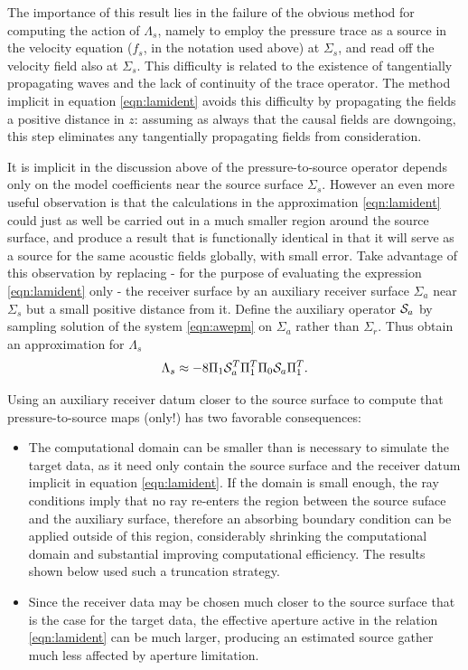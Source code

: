 \documentclass[georeport,12pt]{geophysics}
\begin{document}
The importance of this result lies in the failure of the obvious
method for computing the action of $\Lambda_s$, namely to
employ the pressure trace as a source in the velocity equation ($f_s$,
in the notation used above) at $\Sigma_s$, and read off the velocity
field also at $\Sigma_s$. This difficulty is related to the existence of
tangentially propagating waves and the lack of continuity of the trace
operator. The method implicit in equation \ref{eqn:lamident} avoids
this difficulty by propagating the fields a positive distance in $z$:
assuming as always that the causal fields are downgoing, this step
eliminates any tangentially propagating fields from consideration.

It is implicit in the discussion above of the pressure-to-source operator 
depends only on the model coefficients near the source surface
$\Sigma_s$. However an even more useful
observation is that the calculations in the approximation
\ref{eqn:lamident} could just as well be carried out in a much smaller
region around the source surface, and produce a result that is
functionally identical in that it will serve as a source for the same
acoustic fields globally, with small error. Take advantage of this
observation by replacing - for the purpose of evaluating the
expression \ref{eqn:lamident} only -  the receiver surface by an
auxiliary receiver surface $\Sigma_a$ near $\Sigma_s$ but a small positive
distance from it. Define the auxiliary operator ${\cal S}_a$ by
sampling solution of the system \ref{eqn:awepm} on $\Sigma_a$ rather
than $\Sigma_r$. Thus obtain an approximation for $\Lambda_s$
\begin{equation}
  \label{eqn:lamnear}
 \Lambda_s \approx -8\Pi_1{\cal S}_a^T\Pi_1^T\Pi_0 {\cal S}_a\Pi_1^T. 
\end{equation}

Using an auxiliary receiver datum closer to the source surface to
compute that pressure-to-source maps (only!) has two favorable consequences:
\begin{itemize}
\item The computational domain can be smaller than is necessary to
  simulate the target data, as it need only contain the source
  surface and the receiver datum implicit in
  equation \ref{eqn:lamident}. If the domain is small enough, the ray
  conditions imply that no ray re-enters the region between the source
  suface and the auxiliary surface, therefore an absorbing boundary
  condition can be applied outside of this region, considerably
  shrinking the computational domain and substantial improving computational
  efficiency. The results shown below used such a truncation strategy.
\item Since the receiver data may be chosen much closer to the
  source surface that is the case for the target data, the effective
  aperture active in the relation \ref{eqn:lamident} can be much
  larger, producing an estimated source gather much less affected by
  aperture limitation.
\end{itemize}
\end{document}
